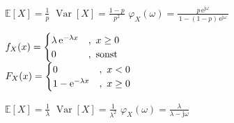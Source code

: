 \documentclass[8pt,a4paper,landscape]{extarticle}
\begin{document}
\begin{multicols*}{6}
\vspace{38pt}

\vspace{12pt}
\fsubcols
{\CheatsheetItemListStart
{}
\CheatsheetItemListEnd
$\mathbb{E}[X] = \frac{1}{p}$
}
{
\CheatsheetItemListStart
{}
\CheatsheetItemListEnd
$\operatorname{Var}[X] = \frac{1-p}{p^{2}}$
}
\vspace{4pt}
\CheatsheetItemListStart
{}
\CheatsheetItemListEnd
$\varphi_X(\omega) = \frac{p\,\mathrm{e}^{\mathrm{j}\omega}}{\,1 - (1-p)\,\mathrm{e}^{\mathrm{j}\omega}\,}$

\vspace{2pt}

\vspace{20pt}
\begin{varwidth}{\dimexpr{}\fboxsep\relax}
  \ensuremath{
    \begin{array}{lll}
      \hspace*{-5pt}
      f_X(x) = \begin{cases}
        \lambda\,\mathrm{e}^{-\lambda x} & ,\ x \ge 0 \\
        0 & ,\ \text{sonst}
      \end{cases} \\[8pt]
      \hspace*{-5pt}
      F_X(x) = \begin{cases}
        0 & ,\ x < 0 \\
        1 - \mathrm{e}^{-\lambda x} & ,\ x \ge 0
      \end{cases}
    \end{array}
  }
\end{varwidth}
\vspace{10pt}

\vspace{34pt}

\vspace{12pt}
\fsubcols
{\CheatsheetItemListStart
{}
\CheatsheetItemListEnd
$\mathbb{E}[X] = \frac{1}{\lambda}$
}
{
\CheatsheetItemListStart
{}
\CheatsheetItemListEnd
$\operatorname{Var}[X] = \frac{1}{\lambda^{2}}$
}
\vspace{4pt}
\CheatsheetItemListStart
{}
\CheatsheetItemListEnd
$\varphi_X(\omega) = \frac{\lambda}{\lambda - \mathrm{j}\omega}$


\end{multicols*}
\end{document}
